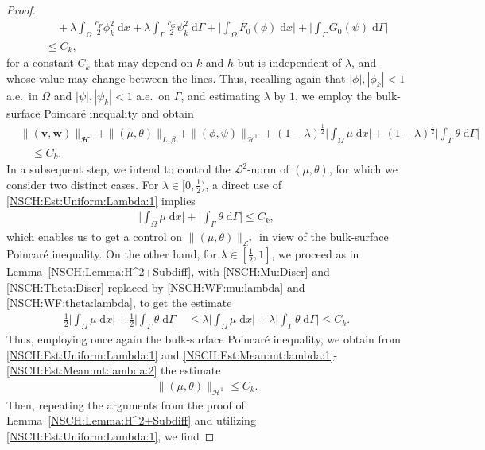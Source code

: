 \documentclass[11pt,reqno]{amsart}
\theoremstyle{remark}
\numberwithin{equation}{section}
\newcommand{\abs}[1]{|#1|}
\newcommand{\Bigabs}[1]{\Big| #1 \Big|}
\newcommand{\norm}[1]{\| #1 \|}
\newcommand{\intO}{\int_\Omega}
\newcommand{\intG}{\int_\Gamma}
\newcommand{\dx}{\;\mathrm{d}x}
\newcommand{\dG}{\;\mathrm d\Ga}
\newcommand{\Om}{\Omega}
\newcommand{\Ga}{\Gamma}
\newcommand{\bv}{\mathbf v}
\newcommand{\bw}{\mathbf w}
\begin{document}
\begin{proof}
\begin{align}
    &\qquad + \lambda \intO \frac{c_F}{2}\phi_k^2\dx + \lambda \intG \frac{c_G}{2}\psi_k^2\dG + \Bigabs{\intO F_0(\phi)\dx} + \Bigabs{\intG G_0(\psi)\dG} \nonumber \\
    &\quad\leq C_k, 
\end{align}
for a constant $C_k$ that may depend on $k$ and $h$ but is independent of $\lambda$, and  whose value may change between the lines.
Thus, recalling again that $\abs{\phi}, \abs{\phi_k} < 1$ a.e.~in $\Om$ and $\abs{\psi}, \abs{\psi_k} < 1$ a.e.~on $\Ga$, and estimating $\lambda$ by $1$, we employ the bulk-surface Poincar\'{e} inequality and obtain
\begin{align}\label{NSCH:Est:Uniform:Lambda:1}
	&\norm{(\bv,\bw)}_{\mathbfcal{H}^1} + \norm{(\mu,\theta)}_{L,\beta} + \norm{(\phi,\psi)}_{\mathcal{H}^1} + (1-\lambda)^{\frac12}\Bigabs{\intO\mu\dx} + (1-\lambda)^{\frac12}\Bigabs{\intG\theta\dG} \nonumber \\
    &\quad\leq C_k.
\end{align}
In a subsequent step, we intend to control the $\mathcal{L}^2$-norm of $(\mu,\theta)$, for which we consider two distinct cases. For $\lambda\in[0,\tfrac12)$, a direct use of \eqref{NSCH:Est:Uniform:Lambda:1} implies
\begin{align}\label{NSCH:Est:Mean:mt:lambda:1}
    \Bigabs{\intO\mu\dx} + \Bigabs{\intG\theta\dG} \leq C_k,
\end{align}
which enables us to get a control on $\norm{(\mu,\theta)}_{\mathcal{L}^2}$ in view of the bulk-surface Poincar\'{e} inequality. On the other hand, for $\lambda\in[\tfrac12,1]$, we proceed as in Lemma~\ref{NSCH:Lemma:H^2+Subdiff}, with \eqref{NSCH:Mu:Discr} and \eqref{NSCH:Theta:Discr} replaced by \eqref{NSCH:WF:mu:lambda} and \eqref{NSCH:WF:theta:lambda}, to get the estimate
\begin{align}\label{NSCH:Est:Mean:mt:lambda:2}
    \frac12\Bigabs{\intO\mu\dx} + \frac12\Bigabs{\intG\theta\dG} &\leq \lambda\Bigabs{\intO\mu\dx} + \lambda\Bigabs{\intG\theta\dG} \leq C_k.
\end{align}
Thus, employing once again the bulk-surface Poincar\'{e} inequality, we obtain from \eqref{NSCH:Est:Uniform:Lambda:1} and \eqref{NSCH:Est:Mean:mt:lambda:1}-\eqref{NSCH:Est:Mean:mt:lambda:2} the estimate
\begin{align}\label{NSCH:Est:mt:H^1:k}
	\norm{(\mu,\theta)}_{\mathcal{H}^1} \leq C_k.
\end{align}
Then, repeating the arguments from the proof of Lemma~\ref{NSCH:Lemma:H^2+Subdiff} and utilizing \eqref{NSCH:Est:Uniform:Lambda:1}, we find

\end{proof}
\end{document}
